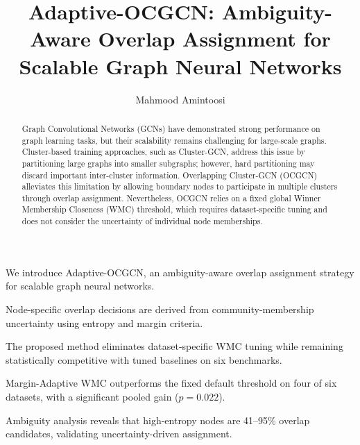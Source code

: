 \documentclass[a4paper,11pt,oneside,onecolumn,preprint]{elsarticle}
\numberwithin{equation}{section}
\begin{document}
\begin{frontmatter}
\title{Adaptive-OCGCN: Ambiguity-Aware Overlap Assignment for Scalable Graph Neural Networks}

\author{Mahmood Amintoosi}

\begin{highlights}
\item We introduce Adaptive-OCGCN, an ambiguity-aware overlap assignment strategy for scalable graph neural networks.
\item Node-specific overlap decisions are derived from community-membership uncertainty using entropy and margin criteria.
\item The proposed method eliminates dataset-specific WMC tuning while remaining statistically competitive with tuned baselines on six benchmarks.
\item Margin-Adaptive WMC outperforms the fixed default threshold on four of six datasets, with a significant pooled gain ($p=0.022$).
\item Ambiguity analysis reveals that high-entropy nodes are 41--95\% overlap candidates, validating uncertainty-driven assignment.
\end{highlights}

\begin{abstract}
Graph Convolutional Networks (GCNs) have demonstrated strong performance on graph learning tasks, but their scalability remains challenging for large-scale graphs.
Cluster-based training approaches, such as Cluster-GCN, address this issue by partitioning large graphs into smaller subgraphs; however, hard partitioning may discard important inter-cluster information.
Overlapping Cluster-GCN (OCGCN) alleviates this limitation by allowing boundary nodes to participate in multiple clusters through overlap assignment.
Nevertheless, OCGCN relies on a fixed global Winner Membership Closeness (WMC) threshold, which requires dataset-specific tuning and does not consider the uncertainty of individual node memberships.


\end{abstract}
\end{frontmatter}
\end{document}
